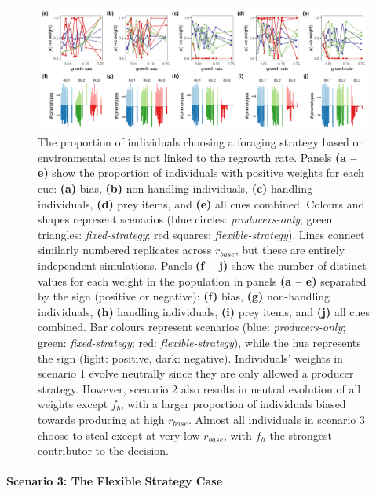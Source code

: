 \documentclass[11pt]{article}
\begin{document}
\begin{figure}[h]
    \centering
    \includegraphics[width=0.99\textwidth]{figures/fig_04_strategy_weight_end_vals.png}
    \caption{
        The proportion of individuals choosing a foraging strategy based on environmental cues is not linked to the regrowth rate.
        Panels \textbf{(a -- e)} show the proportion of individuals with positive weights for each cue: \textbf{(a)} bias, \textbf{(b)} non-handling individuals, \textbf{(c)} handling individuals, \textbf{(d)} prey items, and \textbf{(e)} all cues combined.
        Colours and shapes represent scenarios (blue circles: \textit{producers-only}; green triangles: \textit{fixed-strategy}; red squares: \textit{flexible-strategy}).
        Lines connect similarly numbered replicates across $r_{base}$, but these are entirely independent simulations.
        Panels \textbf{(f -- j)} show the number of distinct values for each weight in the population in panels \textbf{(a -- e)} separated by the sign (positive or negative): \textbf{(f)} bias, \textbf{(g)} non-handling individuals, \textbf{(h)} handling individuals, \textbf{(i)} prey items, and \textbf{(j)} all cues combined.
        Bar colours represent scenarios (blue: \textit{producers-only}; green: \textit{fixed-strategy}; red: \textit{flexible-strategy}), while the hue represents the sign (light: positive, dark: negative).
        Individuals' weights in scenario 1 evolve neutrally since they are only allowed a producer strategy.
        However, scenario 2 also results in neutral evolution of all weights except $f_b$, with a larger proportion of individuals biased towards producing at high $r_{base}$.
        Almost all individuals in scenario 3 choose to steal except at very low $r_{base}$, with $f_h$ the strongest contributor to the decision.
    }
    \label{fig:figure_pipeline}
\end{figure}

\paragraph{Scenario 3: The Flexible Strategy Case}
\end{document}
